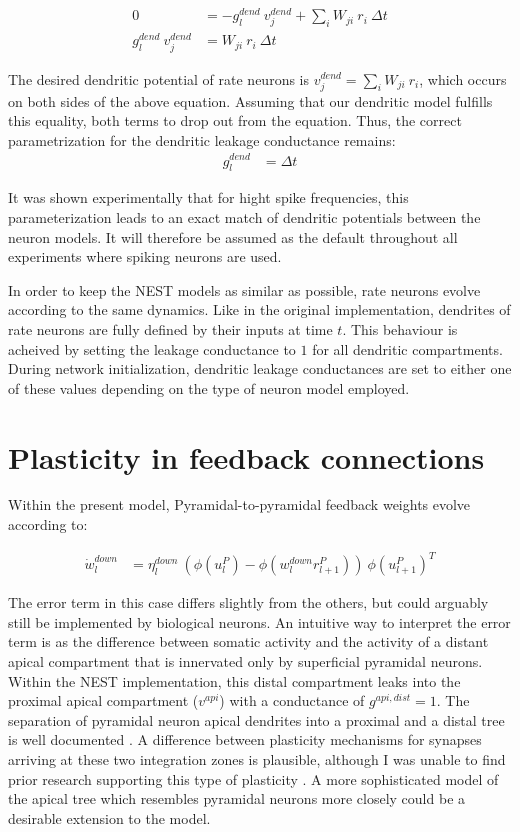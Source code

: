 \begin{align}
  0                        & = -g_l^{dend} \  v_j^{dend} + \sum_i W_{ji} \    r_i \ \Delta t \\
  g_l^{dend} \  v_j^{dend} & = W_{ji} \    r_i \ \Delta t
\end{align}

The desired dendritic potential of rate neurons is $v_j^{dend} = \sum_i W_{ji} \ r_i$, which occurs on both sides of the
above equation. Assuming that our dendritic model fulfills this equality, both terms to drop out from the equation.
Thus, the correct parametrization for the dendritic leakage conductance remains:
\begin{align}
  g_l^{dend} & = \Delta t
\end{align}

It was shown experimentally that for hight spike frequencies, this parameterization leads to an exact match of dendritic
potentials between the neuron models. It will therefore be assumed as the default throughout all experiments where
spiking neurons are used. \newline

In order to keep the NEST models as similar as possible, rate neurons evolve according to the same dynamics. Like in the
original implementation, dendrites of rate neurons are fully defined by their inputs at time $t$. This behaviour is
acheived by setting the leakage conductance to $1$ for all dendritic compartments. During network initialization,
dendritic leakage conductances are set to either one of these values depending on the type of neuron model employed.


\section{Plasticity in feedback connections}\label{sec-feedback-plast}

Within the present model, Pyramidal-to-pyramidal feedback weights evolve according to:

\begin{align}
  \dot{w}_{l}^{down} & = \eta_l^{down} \ ( \phi(u_l^{P}) - \phi(w_l^{down} r_{l+1}^P) )\ \phi(u_{l+1}^{P})^T
\end{align}

The error term in this case differs slightly from the others, but could arguably still be implemented by biological
neurons. An intuitive way to interpret the error term is as the difference between somatic activity and the activity of
a distant apical compartment that is innervated only by superficial pyramidal neurons. Within the NEST implementation,
this distal compartment leaks into the proximal apical compartment ($v^{api}$) with a conductance of $g^{api,dist}=1$.
The separation of pyramidal neuron apical dendrites into a proximal and a distal tree is well documented \citeme. A
difference between plasticity mechanisms for synapses arriving at these two integration zones is plausible, although I
was unable to find prior research supporting this type of plasticity \citeme.  A more sophisticated model of the apical
tree which resembles pyramidal neurons more closely could be a desirable extension to the model.

